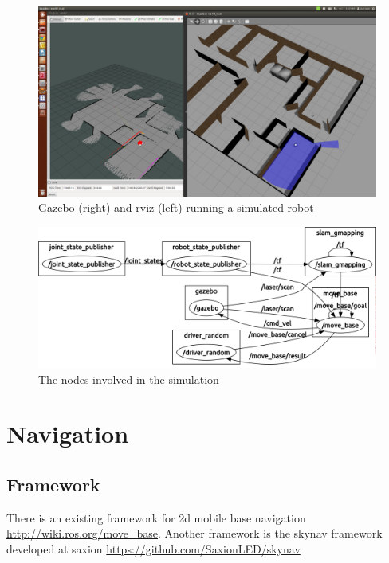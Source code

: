 \documentclass[a4paper]{article}
\begin{document}
\begin{figure}[h!]
  \centering
  \includegraphics[width=\textwidth,height=\textheight,keepaspectratio]{img/office_sim_testgmapping.png}
  \caption{Gazebo (right) and rviz (left) running a simulated robot}
\end{figure}

\begin{figure}[h!]
  \includegraphics[width=\textwidth,height=\textheight,keepaspectratio]{img/simulatie_nodes.png}
  \caption{The nodes involved in the simulation}
\end{figure}

\section{Navigation}

\subsection{Framework}

There is an existing framework for 2d mobile base navigation \url{http://wiki.ros.org/move_base}.
Another framework is the skynav framework developed at saxion \url{https://github.com/SaxionLED/skynav}
\end{document}
